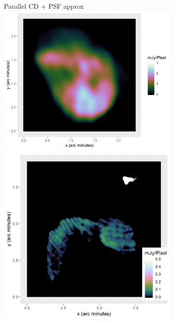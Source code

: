 \begin{figure}[h]
\begin{subfigure}{0.3\linewidth}
	\end{subfigure}
	\begin{subfigure}{0.3\linewidth}
		\centering
		Parallel CD + PSF approx
		\includegraphics[width=1.0\linewidth]{./chapters/10.results/pcdm/PCDM-N132.png}
		\\
		\includegraphics[width=1.0\linewidth]{./chapters/10.results/pcdm/PCDM-Calibration.png}

\end{subfigure}
\end{figure}
